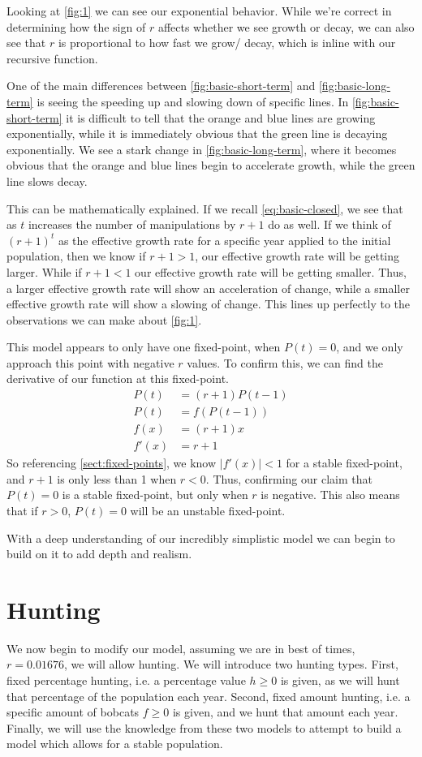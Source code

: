 \documentclass{article}
\begin{document}
Looking at \cref{fig:1} we can see our exponential behavior. While we're correct in determining how the sign of $r$ affects whether we see growth or decay, we can also see that $r$ is proportional to how fast we grow/ decay, which is inline with our recursive function.

One of the main differences between \cref{fig:basic-short-term} and \cref{fig:basic-long-term} is seeing the speeding up and slowing down of specific lines. In \cref{fig:basic-short-term} it is difficult to tell that the orange and blue lines are growing exponentially, while it is immediately obvious that the green line is decaying exponentially. We see a stark change in \cref{fig:basic-long-term}, where it becomes obvious that the orange and blue lines begin to accelerate growth, while the green line slows decay.

This can be mathematically explained. If we recall \cref{eq:basic-closed}, we see that as $t$ increases the number of manipulations by $r + 1$ do as well. If we think of $(r+1)^t$ as the effective growth rate for a specific year applied to the initial population, then we know if $r + 1 > 1$, our effective growth rate will be getting larger. While if $r + 1 < 1$ our effective growth rate will be getting smaller. Thus, a larger effective growth rate will show an acceleration of change, while a smaller effective growth rate will show a slowing of change. This lines up perfectly to the observations we can make about \cref{fig:1}.

This model appears to only have one fixed-point, when $P(t) = 0$, and we only approach this point with negative $r$ values. To confirm this, we can find the derivative of our function at this fixed-point.
\begin{align*}
    P(t) &= (r+1)P(t-1) \\
    P(t) &= f(P(t-1)) \\
    f(x) &= (r+1)x \\
    f'(x) &= r+1
\end{align*}
So referencing \cref{sect:fixed-points}, we know $|f'(x)| < 1$ for a stable fixed-point, and $r+1$ is only less than 1 when $r < 0$. Thus, confirming our claim that $P(t) = 0$ is a stable fixed-point, but only when $r$ is negative. This also means that if $r > 0$, $P(t) = 0$ will be an unstable fixed-point.

With a deep understanding of our incredibly simplistic model we can begin to build on it to add depth and realism.

\section{Hunting}
We now begin to modify our model, assuming we are in best of times, $r = 0.01676$, we will allow hunting. We will introduce two hunting types. First, fixed percentage hunting, i.e. a percentage value $h \ge 0$ is given, as we will hunt that percentage of the population each year. Second, fixed amount hunting, i.e. a specific amount of bobcats $f \ge 0$ is given, and we hunt that amount each year. Finally, we will use the knowledge from these two models to attempt to build a model which allows for a stable population.
\end{document}

